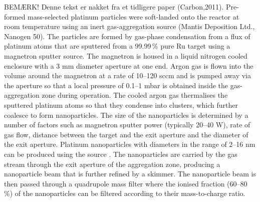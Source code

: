 \documentclass[8.5pt,twoside,twocolumn]{article}
\begin{document}
BEMÆRK! Denne tekst er nakket fra et tidligere paper (Carbon,2011). Pre-formed mass-selected platinum particles were soft-landed onto the reactor at room temperature using an inert gas-aggregation source (Mantis Deposition Ltd., Nanogen 50). The particles are formed by gas-phase condensation from a ﬂux of platinum atoms that are sputtered from a 99.99\,\% pure Ru target using a magnetron sputter source. The magnetron is housed in a liquid nitrogen cooled enclosure with a 3 mm diameter aperture at one end. Argon gas is ﬂown into the volume around the magnetron at a rate of 10–120 sccm and is pumped away via the aperture so that a local pressure of 0.1–1 mbar is obtained inside the gas-aggregation zone during operation. The cooled argon gas thermalises the sputtered platinum atoms so that they condense into clusters, which further coalesce to form nanoparticles. The size of the nanoparticles is determined by a number of factors such as magnetron sputter power (typically 20–40 W), rate of gas flow, distance between the target and the exit aperture and the diameter of the exit aperture. Platinum nanoparticles with diameters in the range of 2–16 nm can be produced using the source \cite{Nielsen2010,Nielsen2009}. The nanoparticles are carried by the gas stream through the exit aperture of the aggregation zone, producing a nanoparticle beam that is further reﬁned by a skimmer. The nanoparticle beam is then passed through a quadrupole mass ﬁlter where the ionised fraction (60–80\,\%) of the nanoparticles can be ﬁltered according to their mass-to-charge ratio.
\end{document}
